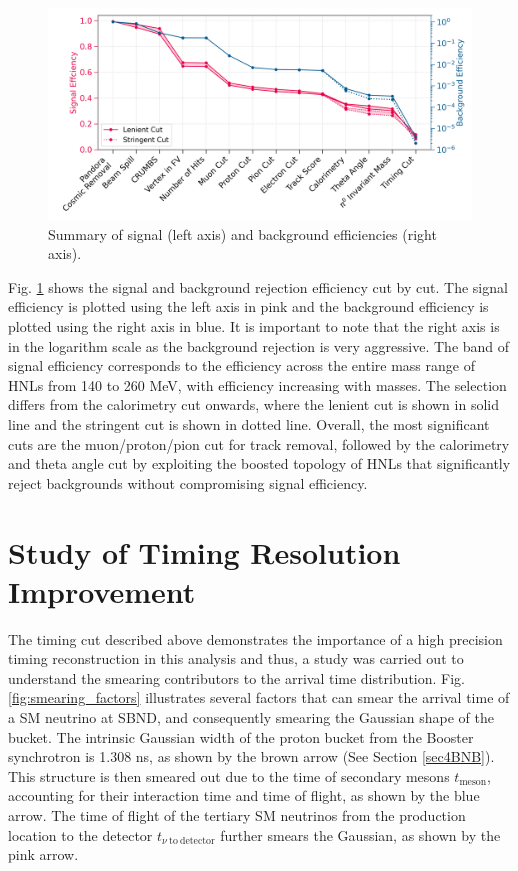 \begin{figure}[bp!]
    \centering 
    \includegraphics[width=1.0\textwidth]{peff_band}
    \caption[Summary of Selection Efficiency.]{
		Summary of signal (left axis) and background efficiencies (right axis).
	}
        \label{fig:eff}
\end{figure}

Fig. \ref{fig:eff} shows the signal and background rejection efficiency cut by cut.
The signal efficiency is plotted using the left axis in pink and the background efficiency is plotted using the right axis in blue.
It is important to note that the right axis is in the logarithm scale as the background rejection is very aggressive.
The band of signal efficiency corresponds to the efficiency across the entire mass range of HNLs from 140 to 260 MeV, with efficiency increasing with masses. 
The selection differs from the calorimetry cut onwards, where the lenient cut is shown in solid line and the stringent cut is shown in dotted line.
Overall, the most significant cuts are the muon/proton/pion cut for track removal, followed by the calorimetry and theta angle cut by exploiting the boosted topology of HNLs that significantly reject backgrounds without compromising signal efficiency.


\section{Study of Timing Resolution Improvement}
\label{sec:truth_bucket}

The timing cut described above demonstrates the importance of a high precision timing reconstruction in this analysis and thus, a study was carried out to understand the smearing contributors to the arrival time distribution. 
Fig. \ref{fig:smearing_factors} illustrates several factors that can smear the arrival time of a SM neutrino at SBND, and consequently smearing the Gaussian shape of the bucket.
The intrinsic Gaussian width of the proton bucket from the Booster synchrotron is 1.308 ns, as shown by the brown arrow (See Section \ref{sec4BNB}).
This structure is then smeared out due to the time of secondary mesons $t_{\mathrm{meson}}$, accounting for their interaction time and time of flight, as shown by the blue arrow.
The time of flight of the tertiary SM neutrinos from the production location to the detector $t_{\nu\ \mathrm{to\ detector}}$ further smears the Gaussian, as shown by the pink arrow.

